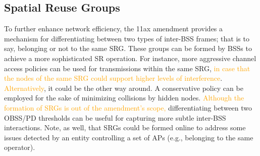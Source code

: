 \documentclass{ieeeaccess}
\begin{document}
\subsection{Spatial Reuse Groups}
\label{section:srg}
To further enhance network efficiency, the 11ax amendment provides a mechanism for differentiating between two types of inter-BSS frames; that is to say, belonging or not to the same SRG. These groups can be formed by BSSs to achieve a more sophisticated SR operation. For instance, more aggressive channel access policies can be used for transmissions within the same SRG, \textcolor{orange}{in case that the nodes of the same SRG could support higher levels of interference}. \textcolor{orange}{Alternatively}, it could be the other way around. A conservative policy can be employed for the sake of minimizing collisions by hidden nodes. \textcolor{orange}{Although the formation of SRGs is out of the amendment's scope,} differentiating between two OBSS/PD thresholds can be useful for capturing more subtle inter-BSS interactions. Note, as well, that SRGs could be formed online to address some issues detected by an entity controlling a set of APs (e.g., belonging to the same operator).
\end{document}
